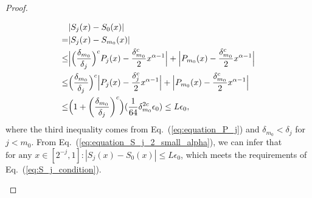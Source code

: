 \documentclass[journal]{IEEEtran}
\newcommand{\eq}[1]{Eq.~(\ref{eq:#1})}
\begin{document}
\begin{proof}
\begin{itemize}[leftmargin=*]
    \begin{align}
        &|S_j(x)-S_0(x)| \nonumber \\
        = & |S_j(x)-S_{m_0}(x)| \nonumber\\
        \le & \Bigl|\Bigl(\frac{\delta_{m_0}}{\delta_j}\Bigr)^{c}P_j(x)-\frac{\delta_{m_0}^{c}}{2}x^{\alpha-1}\Bigr| + \Bigl|P_{m_0}(x)-\frac{\delta_{m_0}^{c}}{2}x^{\alpha-1}\Bigr|\nonumber \\
        \le & \Bigl(\frac{\delta_{m_0}}{\delta_j}\Bigr)^{c}\Bigl|P_j(x)-\frac{\delta_{j}^{c}}{2}x^{\alpha-1}\Bigr| + \Bigl|P_{m_0}(x)-\frac{\delta_{m_0}^{c}}{2}x^{\alpha-1}\Bigr|\nonumber\\
        \le & \Bigl(1+\left(\frac{\delta_{m_0}}{\delta_j}\right)^{c}\Bigr)(\frac{1}{64}\delta^{2c}_{m_0}\epsilon_{0}) \le L\epsilon_{0} \label{eq:equation_S_j_2_small_alpha},
    \end{align}
    where the third inequality comes from \eq{equation_P_j} and $\delta_{m_0} < \delta_j$ for $j < m_0$.
    From \eq{equation_S_j_2_small_alpha}, we can infer that $\text{for any } x\in [ 2^{-j},1]:|S_j(x)-S_0(x)| \le L\epsilon_{0}$, which meets the requirements of \eq{S_j_condition}.
    \end{itemize}

  


    


\end{proof}
\end{document}
